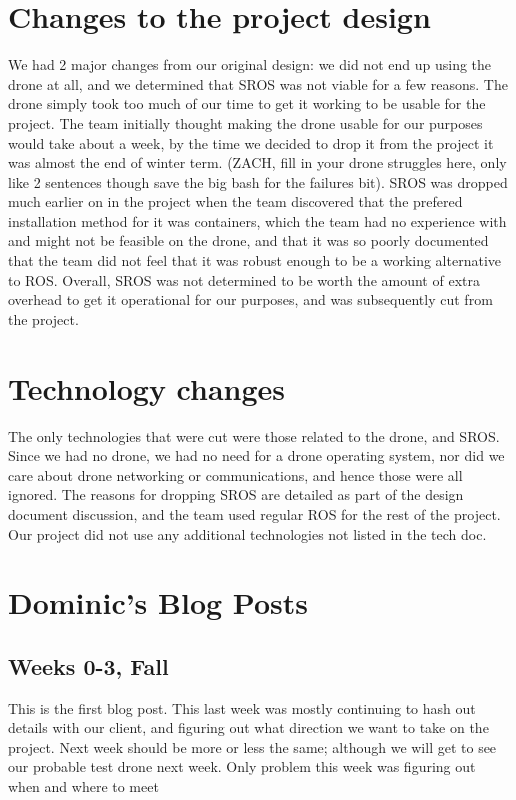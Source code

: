 \documentclass[IEEEtran,letterpaper,10pt,notitlepage,draftclsnofoot,onecolumn]{article}
\begin{document}
\section{Changes to the project design}
We had 2 major changes from our original design: we did not end up using 
the drone at all, and we determined that SROS was not viable for a few 
reasons. The drone simply took too much of our time to get it working to be 
usable for the project. The team initially thought making the drone usable 
for our purposes would take about a week, by the time we decided to drop it 
from the project it was almost the end of winter term. (ZACH, fill in your 
drone struggles here, only like 2 sentences though save the big bash for 
the failures bit). SROS was dropped much earlier on in the project when 
the team discovered that the prefered installation method for it was 
containers, which the team had no experience with and might not be feasible 
on the drone, and that it was so poorly documented that the team did not feel 
that it was robust enough to be a working alternative to ROS. Overall, SROS 
was not determined to be worth the amount of extra overhead to get it 
operational for our purposes, and was subsequently cut from the project.
\newpage
\section{Technology changes}
The only technologies that were cut were those related to the drone, and SROS.
Since we had no drone, we had no need for a drone operating system, nor did 
we care about drone networking or communications, and hence those were all 
ignored. The reasons for dropping SROS are detailed as part of the design 
document discussion, and the team used regular ROS for the rest of the project. 
Our project did not use any additional technologies not listed in the tech doc.
\newpage
\section{Dominic's Blog Posts}
\subsection{Weeks 0-3, Fall}
This is the first blog post. This last week was mostly continuing to hash out 
details with our client, and figuring out what direction we want to take on 
the project. Next week should be more or less the same; although we will get 
to see our probable test drone next week. Only problem this week was figuring 
out when and where to meet
\end{document}
